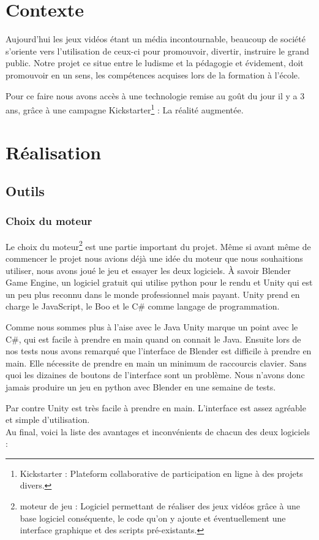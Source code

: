 \documentclass[a4paper,11pt]{myreport}
\begin{document}
\chapter{Contexte}
\par Aujourd'hui les jeux vidéos étant un média incontournable, beaucoup de société s'oriente vers l'utilisation de ceux-ci pour promouvoir, divertir, instruire le grand public. Notre projet ce situe entre le ludisme et la pédagogie et évidement, doit promouvoir en un sens, les compétences acquises lors de la formation à l'école.
\par Pour ce faire nous avons accès à une technologie remise au goût du jour il y a 3 ans, grâce à une campagne Kickstarter\footnote{Kickstarter : Plateform collaborative de participation en ligne à des projets divers.} : La réalité augmentée.


\chapter{Réalisation}
\section{Outils}
\subsection{Choix du moteur}
\par Le choix du moteur\footnote{moteur de jeu : Logiciel permettant de réaliser des jeux vidéos grâce à une base logiciel conséquente, le code qu'on y ajoute et éventuellement une interface graphique et des scripts pré-existants.} est une partie important du projet. Même si avant même de commencer le projet nous avions déjà une idée du moteur que nous souhaitions utiliser, nous avons joué le jeu et essayer les deux logiciels. \`A savoir Blender Game Engine, un logiciel gratuit qui utilise python pour le rendu et Unity qui est un peu plus reconnu dans le monde professionnel mais payant. Unity prend en charge le JavaScript, le Boo et le C\# comme langage de programmation.

\par Comme nous sommes plus à l'aise avec le Java Unity marque un point avec le C\#, qui est facile à prendre en main quand on connait le Java. Ensuite lors de nos tests nous avons remarqué que l'interface de Blender est difficile à prendre en main. Elle nécessite de prendre en main un minimum de raccourcis clavier. Sans quoi les dizaines de boutons de l'interface sont un problème. Nous n'avons donc jamais produire un jeu en python avec Blender en une semaine de tests.
\par Par contre Unity est très facile à prendre en main. L'interface est assez agréable et simple d'utilisation.
\\Au final, voici la liste des avantages et inconvénients de chacun des deux logiciels :
\end{document}

